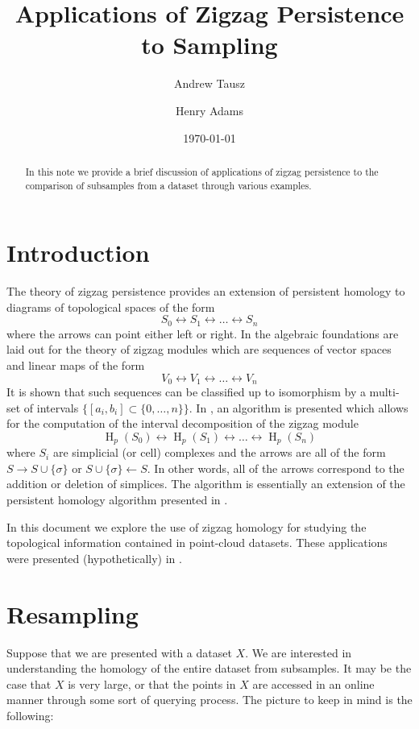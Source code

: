 \documentclass[10pt]{amsart}
\title{Applications of Zigzag Persistence to Sampling}
\author{Andrew Tausz}
\author{Henry Adams}
\date{\today}
\newcommand{\Ho}{\operatorname{H}}
\begin{document}
\maketitle

\begin{abstract}
In this note we provide a brief discussion of applications of zigzag persistence to the comparison of subsamples from a dataset through various examples.
\end{abstract}

\section{Introduction}

The theory of zigzag persistence provides an extension of persistent homology to diagrams of topological spaces of the form
$$S_0 \leftrightarrow S_1 \leftrightarrow \ldots \leftrightarrow S_n$$
where the arrows can point either left or right. In \cite{Zigzag1} the algebraic foundations are laid out for the theory of zigzag modules which are sequences of vector spaces and linear maps of the form
$$V_0 \leftrightarrow V_1 \leftrightarrow \ldots \leftrightarrow V_n$$
It is shown that such sequences can be classified up to isomorphism by a multi-set of intervals $\{[a_i, b_i] \subset \{0, \ldots, n\}\}$. In \cite{Zigzag2}, an algorithm is presented which allows for the computation of the interval decomposition of the zigzag module
$$\Ho_p(S_0) \leftrightarrow \Ho_p(S_1) \leftrightarrow \ldots \leftrightarrow \Ho_p(S_n)$$
where $S_i$ are simplicial (or cell) complexes and the arrows are all of the form $S \rightarrow S \cup \{ \sigma \}$ or $S \cup \{ \sigma \} \leftarrow S$. In other words, all of the arrows correspond to the addition or deletion of simplices. The algorithm is essentially an extension of the persistent homology algorithm presented in \cite{Carlsson_04}.

In this document we explore the use of zigzag homology for studying the topological information contained in point-cloud datasets. These applications were presented (hypothetically) in \cite{Carlsson_09}. 

\section{Resampling}

Suppose that we are presented with a dataset $X$. We are interested in understanding the homology of the entire dataset from subsamples. It may be the case that $X$ is very large, or that the points in $X$ are accessed in an online manner through some sort of querying process. The picture to keep in mind is the following:
\end{document}
